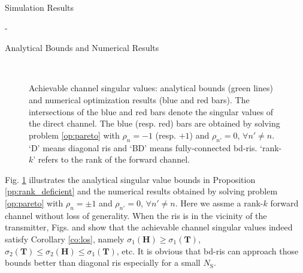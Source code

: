 \begin{section}{Simulation Results}
\begin{subsection}{-}
		\begin{subsubsection}{Analytical Bounds and Numerical Results}
			\begin{figure}[H]
				\centering
				\\
				\caption{
					Achievable channel singular values: analytical bounds (green lines) and numerical optimization results (blue and red bars).
					The intersections of the blue and red bars denote the singular values of the direct channel.
					The blue (resp. red) bars are obtained by solving problem \eqref{op:pareto} with $\rho_n = -1$ (resp. $+1$) and $\rho_{n'} = 0$, $\forall n' \ne n$.
					`D' means diagonal \gls{ris} and `BD' means fully-connected \gls{bd}-\gls{ris}.
					`rank-$k$' refers to the rank of the forward channel.
				}
				\label{fg:singular_bound}
			\end{figure}
			Fig. \ref{fg:singular_bound} illustrates the analytical singular value bounds in Proposition \ref{pp:rank_deficient} and the numerical results obtained by solving problem \eqref{op:pareto} with $\rho_n = \pm 1$ and $\rho_{n'} = 0$, $\forall n' \ne n$.
			Here we assme a rank-$k$ forward channel without loss of generality.
			When the \gls{ris} is in the vicinity of the transmitter, Figs.  and  show that the achievable channel singular values indeed satisfy Corollary \ref{co:los}, namely $\sigma_1(\mathbf{H}) \ge \sigma_1(\mathbf{T})$, $\sigma_2(\mathbf{T}) \le \sigma_2(\mathbf{H}) \le \sigma_1(\mathbf{T})$, etc.
			It is obvious that \gls{bd}-\gls{ris} can approach those bounds better than diagonal \gls{ris} especially for a small $N_\mathrm{S}$.

\end{subsubsection}
\end{subsection}
\end{section}
